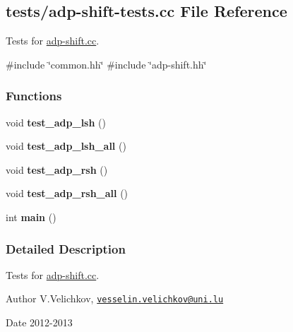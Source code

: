 \hypertarget{adp-shift-tests_8cc}{\subsection{tests/adp-\/shift-\/tests.cc \-File \-Reference}
\label{adp-shift-tests_8cc}
}


\-Tests for \hyperlink{adp-shift_8cc}{adp-\/shift.\-cc}.  


{\ttfamily \#include \char`\"{}common.\-hh\char`\"{}}\*
{\ttfamily \#include \char`\"{}adp-\/shift.\-hh\char`\"{}}\*
\subsubsection*{\-Functions}
\begin{DoxyCompactItemize}
\item 
\hypertarget{adp-shift-tests_8cc_a8ae54784d040d1253b28ee002b44337b}{void {\bfseries test\-\_\-adp\-\_\-lsh} ()}\label{adp-shift-tests_8cc_a8ae54784d040d1253b28ee002b44337b}

\item 
\hypertarget{adp-shift-tests_8cc_a0f1f593e6d41b9ceb5e0f9eabf98d11c}{void {\bfseries test\-\_\-adp\-\_\-lsh\-\_\-all} ()}\label{adp-shift-tests_8cc_a0f1f593e6d41b9ceb5e0f9eabf98d11c}

\item 
\hypertarget{adp-shift-tests_8cc_a3045680da35d8aebac5f0c1b03c934f7}{void {\bfseries test\-\_\-adp\-\_\-rsh} ()}\label{adp-shift-tests_8cc_a3045680da35d8aebac5f0c1b03c934f7}

\item 
\hypertarget{adp-shift-tests_8cc_af524d0c65c86f47362b62d63456324d4}{void {\bfseries test\-\_\-adp\-\_\-rsh\-\_\-all} ()}\label{adp-shift-tests_8cc_af524d0c65c86f47362b62d63456324d4}

\item 
\hypertarget{adp-shift-tests_8cc_ae66f6b31b5ad750f1fe042a706a4e3d4}{int {\bfseries main} ()}\label{adp-shift-tests_8cc_ae66f6b31b5ad750f1fe042a706a4e3d4}

\end{DoxyCompactItemize}


\subsubsection{\-Detailed \-Description}
\-Tests for \hyperlink{adp-shift_8cc}{adp-\/shift.\-cc}. \begin{DoxyAuthor}{\-Author}
\-V.\-Velichkov, \href{mailto:vesselin.velichkov@uni.lu}{\tt vesselin.\-velichkov@uni.\-lu} 
\end{DoxyAuthor}
\begin{DoxyDate}{\-Date}
2012-\/2013 
\end{DoxyDate}

